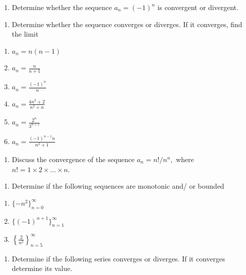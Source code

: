 \documentclass[]{book}
\providecommand{\tightlist}{%
  \setlength{\itemsep}{0pt}\setlength{\parskip}{0pt}}
\begin{document}
\begin{enumerate}
\def\labelenumi{\arabic{enumi}.}
\setcounter{enumi}{4}
\tightlist
\item
  Determine whether the sequence \(a_n= (-1)^n\) is convergent or divergent.
\end{enumerate}

\begin{enumerate}
\def\labelenumi{\arabic{enumi}.}
\setcounter{enumi}{5}
\tightlist
\item
  Determine whether the sequence converges or diverges. If it converges, find the limit
\end{enumerate}

\begin{enumerate}
\def\labelenumi{\alph{enumi})}
\tightlist
\item
  \(a_n= n(n-1)\)
\item
  \(a_n= \frac{n}{n+1}\)
\item
  \(a_n = \frac{(-1)^n}{n}\) 
\item
  \(a_n = \frac{4n^2+2}{n^2+n}\)
\item
  \(a_n= \frac{2^n}{3^{n+1}}\)
\item
  \(a_n= \frac{(-1)^{n-1}n}{n^2+1}\)
\end{enumerate}

\begin{enumerate}
\def\labelenumi{\arabic{enumi}.}
\setcounter{enumi}{6}
\tightlist
\item
  Discuss the convergence of the sequence \(a_n=n!/n^n,\) where \(n!= 1\times2\times\dots\times n.\)
\end{enumerate}

\begin{enumerate}
\def\labelenumi{\arabic{enumi}.}
\setcounter{enumi}{7}
\tightlist
\item
  Determine if the following sequences are monotonic and/ or bounded
\end{enumerate}

\begin{enumerate}
\def\labelenumi{\alph{enumi})}
\tightlist
\item
  \(\{-n^2\}_{n=0}^\infty\)
\item
  \(\{(-1)^{n+1}\}_{n=1}^\infty\)
\item
  \(\left\{ \frac{2}{n^2}\right\}_{n=5}^\infty\)
\end{enumerate}

\begin{enumerate}
\def\labelenumi{\arabic{enumi}.}
\setcounter{enumi}{8}
\tightlist
\item
  Determine if the following series converges or diverges. If it converges determine its value.
\end{enumerate}
\end{document}
